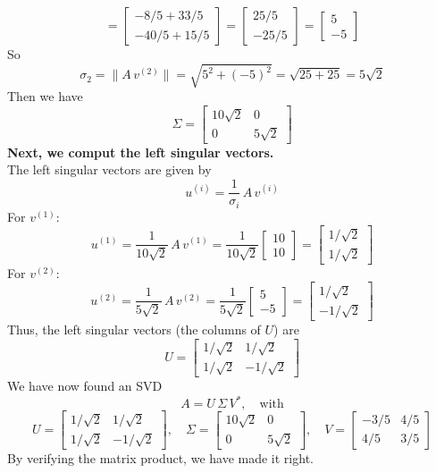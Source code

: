 \documentclass[lang=cn,11pt]{elegantbook}
\begin{document}
\begin{solution}
\[=\begin{bmatrix} -8/5+33/5 \\ -40/5+15/5 \end{bmatrix}
=\begin{bmatrix} 25/5 \\ -25/5 \end{bmatrix}
=\begin{bmatrix} 5 \\ -5 \end{bmatrix}
\]
So
\[
\sigma_2=\|A\,v^{(2)}\|=\sqrt{5^2+(-5)^2}=\sqrt{25+25}=5\sqrt2
\]
Then we have
\[
\Sigma=\begin{bmatrix} 10\sqrt2 & 0\\ 0 & 5\sqrt2 \end{bmatrix}
\]
\textbf{Next, we comput the left singular vectors.}\\
The left singular vectors are given by
\[
u^{(i)}=\frac{1}{\sigma_i}\,A\,v^{(i)}
\]
For \(v^{(1)}\):
\[
u^{(1)}=\frac{1}{10\sqrt2}\,A\,v^{(1)}=\frac{1}{10\sqrt2}\begin{bmatrix} 10 \\ 10 \end{bmatrix}=\begin{bmatrix} 1/\sqrt2 \\ 1/\sqrt2 \end{bmatrix}
\]
For \(v^{(2)}\):
\[
u^{(2)}=\frac{1}{5\sqrt2}\,A\,v^{(2)}=\frac{1}{5\sqrt2}\begin{bmatrix} 5 \\ -5 \end{bmatrix}=\begin{bmatrix} 1/\sqrt2 \\ -1/\sqrt2 \end{bmatrix}
\]
Thus, the left singular vectors (the columns of \(U\)) are
\[
U=\begin{bmatrix} 1/\sqrt2 & 1/\sqrt2 \\ 1/\sqrt2 & -1/\sqrt2 \end{bmatrix}
\]
We have now found an SVD
\[
A=U\,\Sigma\,V^*,\quad\text{with}
\]
\[
U=\begin{bmatrix} 1/\sqrt2 & 1/\sqrt2 \\ 1/\sqrt2 & -1/\sqrt2 \end{bmatrix},\quad
\Sigma=\begin{bmatrix} 10\sqrt2 & 0\\ 0 & 5\sqrt2 \end{bmatrix},\quad
V=\begin{bmatrix} -3/5 & 4/5 \\ 4/5 & 3/5 \end{bmatrix}
\]
By verifying the matrix product, we have made it right.\\\\
\end{solution}
\end{document}
